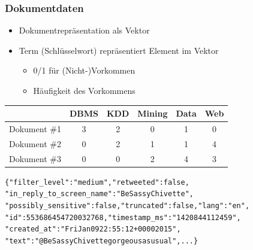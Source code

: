 
\begin{frame}
\frametitle{Dokumentdaten}

\begin{itemize}
\item Dokumentrepräsentation als Vektor
\item Term (Schlüsselwort) repräsentiert Element im Vektor
\begin{itemize}
\item 0/1 für (Nicht-)Vorkommen
\item Häufigkeit des Vorkommens
\end{itemize}
\end{itemize}

\begin{center}
\begin{tabular}{|l|c|c|c|c|c|}
\hline
\rowcolor{Gray} & DBMS & KDD & Mining & Data & Web \\
\hline
\hline
Dokument \#1 & 3 & 2 & 0 & 1 & 0 \\
Dokument \#2 & 0 & 2 & 1 & 1 & 4 \\
Dokument \#3 & 0 & 0 & 2 & 4 & 3 \\
\hline
\end{tabular}
\end{center}

{\scriptsize
\begin{alltt}
\{"filter\_level":"medium","retweeted":false,\\
"{}in\_reply\_to\_screen\_name":"BeSassyChivette", \\
"possibly\_sensitive":false,"truncated":false,"lang":"{}en", \\
"id":553686454720032768,"timestamp\_ms":"1420844112459",\\
"created\_at":"Fri Jan 09 22:55:12 +0000 2015", \\
"text":"@BeSassyChivette gorgeous as usual", ... \}
\end{alltt}
}

\end{frame}


